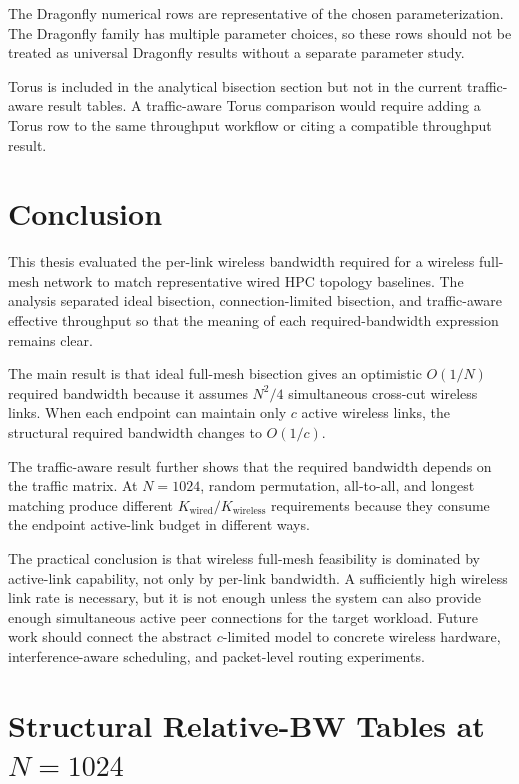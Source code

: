 \documentclass[conference]{IEEEtran}
\begin{document}
The Dragonfly numerical rows are representative of the chosen parameterization. The Dragonfly family has multiple parameter choices, so these rows should not be treated as universal Dragonfly results without a separate parameter study.

Torus is included in the analytical bisection section but not in the current traffic-aware result tables. A traffic-aware Torus comparison would require adding a Torus row to the same throughput workflow or citing a compatible throughput result.

\section{Conclusion}

This thesis evaluated the per-link wireless bandwidth required for a wireless full-mesh network to match representative wired HPC topology baselines. The analysis separated ideal bisection, connection-limited bisection, and traffic-aware effective throughput so that the meaning of each required-bandwidth expression remains clear.

The main result is that ideal full-mesh bisection gives an optimistic \(O(1/N)\) required bandwidth because it assumes \(N^2/4\) simultaneous cross-cut wireless links. When each endpoint can maintain only \(c\) active wireless links, the structural required bandwidth changes to \(O(1/c)\).

The traffic-aware result further shows that the required bandwidth depends on the traffic matrix. At \(N=1024\), random permutation, all-to-all, and longest matching produce different \(K_{\mathrm{wired}}/K_{\mathrm{wireless}}\) requirements because they consume the endpoint active-link budget in different ways.

The practical conclusion is that wireless full-mesh feasibility is dominated by active-link capability, not only by per-link bandwidth. A sufficiently high wireless link rate is necessary, but it is not enough unless the system can also provide enough simultaneous active peer connections for the target workload. Future work should connect the abstract \(c\)-limited model to concrete wireless hardware, interference-aware scheduling, and packet-level routing experiments.

\appendices

\section{Structural Relative-BW Tables at \(N=1024\)}
\end{document}
